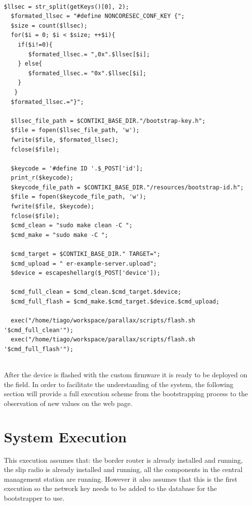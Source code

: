 \begin{lstlisting}[caption={Bootstrapper Credentials Flashing Script}]

$llsec = str_split(getKeys()[0], 2);
  $formated_llsec = "#define NONCORESEC_CONF_KEY {";
  $size = count($llsec);
  for($i = 0; $i < $size; ++$i){
	if($i!=0){
	   $formated_llsec.= ",0x".$llsec[$i];
	} else{
	   $formated_llsec.= "0x".$llsec[$i];
	}
   }
  $formated_llsec.="}";
  
  $llsec_file_path = $CONTIKI_BASE_DIR."/bootstrap-key.h";
  $file = fopen($llsec_file_path, 'w');
  fwrite($file, $formated_llsec);
  fclose($file);
  
  $keycode = '#define ID '.$_POST['id'];
  print_r($keycode);
  $keycode_file_path = $CONTIKI_BASE_DIR."/resources/bootstrap-id.h";
  $file = fopen($keycode_file_path, 'w');
  fwrite($file, $keycode);
  fclose($file);
  $cmd_clean = "sudo make clean -C ";
  $cmd_make = "sudo make -C ";
  
  $cmd_target = $CONTIKI_BASE_DIR." TARGET=";
  $cmd_upload = " er-example-server.upload";
  $device = escapeshellarg($_POST['device']);
  
  $cmd_full_clean = $cmd_clean.$cmd_target.$device;
  $cmd_full_flash = $cmd_make.$cmd_target.$device.$cmd_upload;
  
  exec("/home/tiago/workspace/parallax/scripts/flash.sh '$cmd_full_clean'");
  exec("/home/tiago/workspace/parallax/scripts/flash.sh '$cmd_full_flash'");
  
\end{lstlisting}

After the device is flashed with the custom firmware it is ready to be deployed on the field. In order to facilitate the understanding of the system, the following section will provide a full execution scheme from the bootstrapping process to the observation of new values on the web page.

\section{System Execution}
\label{sec:system_execution}

This execution assumes that: the border router is already installed and running, the slip radio is already installed and running, all the components in the central management station are running. However it also assumes that this is the first execution so the network key needs to be added to the database for the bootstrapper to use.\\


